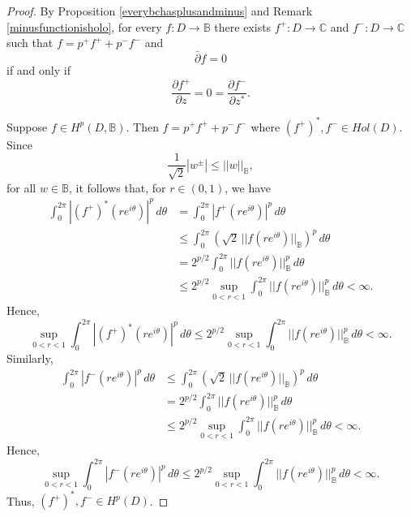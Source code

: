 \documentclass[suppldata]{interact}
\theoremstyle{plain}%
\theoremstyle{definition}
\theoremstyle{remark}
\newcommand{\C}{\mathbb C}
\newcommand{\p}{\partial}
\newcommand{\dbar}{\bar\partial}
\newcommand{\bc}{\mathbb{B}}
\newcommand{\hpb}{H^p(D,\bc)}
\begin{document}
\begin{proof}
    By Proposition \ref{everybchasplusandminus} and Remark \ref{minusfunctionisholo}, for every $f: D \to \bc$ there exists $f^+:D \to \C$ and $f^-: D \to \C$ such that $f = p^+ f^+ + p^- f^-$ and 
    \[
        \dbar f= 0
    \]
    if and only if 
    \[
        \frac{\p f^+}{\p z} = 0 = \frac{\p f^-}{\p z^*}.
    \]

    Suppose $f \in \hpb$. Then $f = p^+ f^+ + p^- f^-$ where $(f^+)^*, f^- \in Hol(D)$. Since 
    \[
        \frac{1}{\sqrt{2}}|w^\pm|\leq ||w||_{\bc},
    \]
    for all $w \in \bc$, it follows that, for $r \in (0,1)$, we have
    \begin{align*}
        \int_0^{2\pi} |(f^+)^*(re^{i\theta})|^p \,d\theta &= \int_0^{2\pi} |f^+(re^{i\theta})|^p \,d\theta \\
        &\leq \int_0^{2\pi} (\sqrt{2}\,||f(re^{i\theta})||_{\bc})^p \,d\theta \\
        &= 2^{p/2}\int_0^{2\pi} ||f(re^{i\theta})||_{\bc}^p \,d\theta \\
        &\leq 2^{p/2} \sup_{0 < r < 1}\int_0^{2\pi} ||f(re^{i\theta})||_{\bc}^p \,d\theta < \infty.
    \end{align*}
    Hence, 
    \[
        \sup_{0 < r < 1}  \int_0^{2\pi} |(f^+)^*(re^{i\theta})|^p \,d\theta \leq 2^{p/2} \sup_{0 < r < 1}\int_0^{2\pi} ||f(re^{i\theta})||_{\bc}^p \,d\theta < \infty.
    \]
    Similarly, 
    \begin{align*}
    \int_0^{2\pi} |f^-(re^{i\theta})|^p \,d\theta 
        &\leq \int_0^{2\pi} (\sqrt{2}\,||f(re^{i\theta})||_{\bc})^p \,d\theta \\
        &= 2^{p/2}\int_0^{2\pi} ||f(re^{i\theta})||_{\bc}^p \,d\theta \\
        &\leq 2^{p/2} \sup_{0 < r < 1}\int_0^{2\pi} ||f(re^{i\theta})||_{\bc}^p \,d\theta < \infty.
    \end{align*}
    Hence, 
    \[
        \sup_{0 < r < 1}  \int_0^{2\pi} |f^-(re^{i\theta})|^p \,d\theta \leq 2^{p/2} \sup_{0 < r < 1}\int_0^{2\pi} ||f(re^{i\theta})||_{\bc}^p \,d\theta < \infty.
    \]
    Thus, $(f^+)^*,f^- \in H^p(D)$.


\end{proof}
\end{document}
